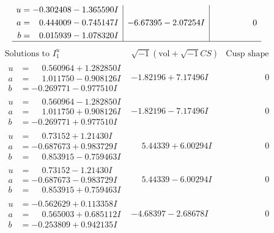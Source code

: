 \documentclass[1p]{elsarticle_modified}
\theoremstyle{definition}
\newcommand{\I}{\sqrt{-1}}
\begin{document}
$$\begin{array}{c|c|c}
\begin{aligned}
u &= -0.302408 - 1.365590 I \\
a &= \phantom{-}0.444009 - 0.745147 I \\
b &= \phantom{-}0.015939 - 1.078320 I\end{aligned}
 & -6.67395 - 2.07254 I & \phantom{-0.000000 } 0\\
 \hline 
 \end{array}$$\newpage$$\begin{array}{c|c|c}  
\text{Solutions to }I^u_{1}& \I (\text{vol} + \sqrt{-1}CS) & \text{Cusp shape}\\
 \hline 
\begin{aligned}
u &= \phantom{-}0.560964 + 1.282850 I \\
a &= \phantom{-}1.011750 - 0.908126 I \\
b &= -0.269771 - 0.977510 I\end{aligned}
 & -1.82196 + 7.17496 I & \phantom{-0.000000 } 0 \\ \hline\begin{aligned}
u &= \phantom{-}0.560964 - 1.282850 I \\
a &= \phantom{-}1.011750 + 0.908126 I \\
b &= -0.269771 + 0.977510 I\end{aligned}
 & -1.82196 - 7.17496 I & \phantom{-0.000000 } 0 \\ \hline\begin{aligned}
u &= \phantom{-}0.73152 + 1.21430 I \\
a &= -0.687673 + 0.983729 I \\
b &= \phantom{-}0.853915 - 0.759463 I\end{aligned}
 & \phantom{-}5.44339 + 6.00294 I & \phantom{-0.000000 } 0 \\ \hline\begin{aligned}
u &= \phantom{-}0.73152 - 1.21430 I \\
a &= -0.687673 - 0.983729 I \\
b &= \phantom{-}0.853915 + 0.759463 I\end{aligned}
 & \phantom{-}5.44339 - 6.00294 I & \phantom{-0.000000 } 0 \\ \hline\begin{aligned}
u &= -0.562629 + 0.113358 I \\
a &= \phantom{-}0.565003 + 0.685112 I \\
b &= -0.253809 + 0.942135 I\end{aligned}
 & -4.68397 - 2.68678 I & \phantom{-0.000000 } 0 \\ \hline\begin{aligned}

\end{aligned}
\end{array}$$
\end{document}
